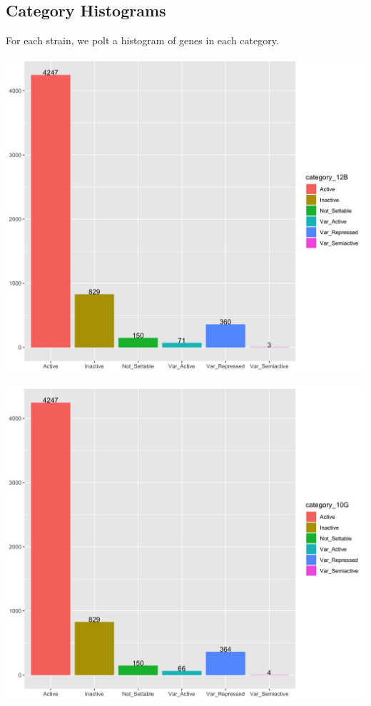 \documentclass[11pt]{article}
\begin{document}
\subsection{Category Histograms}
\label{sec:org169319e}
For each strain, we polt a histogram of genes in each category.

\begin{center}
\includegraphics[width=.9\linewidth]{./Plots/histogram_12B.png}
\end{center}

\begin{center}
\includegraphics[width=.9\linewidth]{./Plots/histogram_10G.png}
\end{center}
\end{document}
